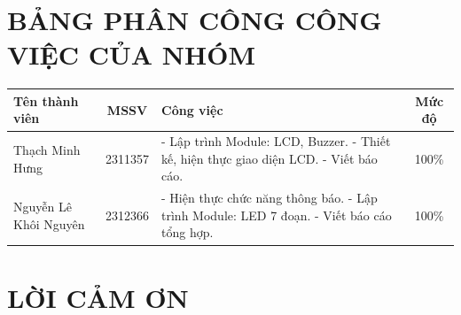 \documentclass[12pt,a4paper]{article}
\begin{document}
\clearpage
{} %
\fancyfoot[R]{\small \thepage} %

\section*{\centering BẢNG PHÂN CÔNG CÔNG VIỆC CỦA NHÓM}
   
    \renewcommand{\arraystretch}{1.3}
    \begin{tabular}{|l|c|p{7.8cm}|c|}
        \hline
        \textbf{Tên thành viên} & \textbf{MSSV} & \textbf{Công việc} & \textbf{Mức độ} \\
        \hline
        
        Thạch Minh Hưng & 2311357 & 
        - Lập trình Module: LCD, Buzzer. \newline
        - Thiết kế, hiện thực giao diện LCD. \newline
        - Viết báo cáo.
        & 100\% \\

        \hline
        Nguyễn Lê Khôi Nguyên & 2312366 &
        - Hiện thực chức năng thông báo. \newline
        - Lập trình Module: LED 7 đoạn. \newline
        - Viết báo cáo tổng hợp.
        & 100\% \\
        \hline
    \end{tabular}
\vspace{0.1pt}

\renewcommand{\arraystretch}{1.4}
\setlength{\tabcolsep}{8pt}





\clearpage




\newpage


\cleardoublepage %
\section*{LỜI CẢM ƠN}
\end{document}
